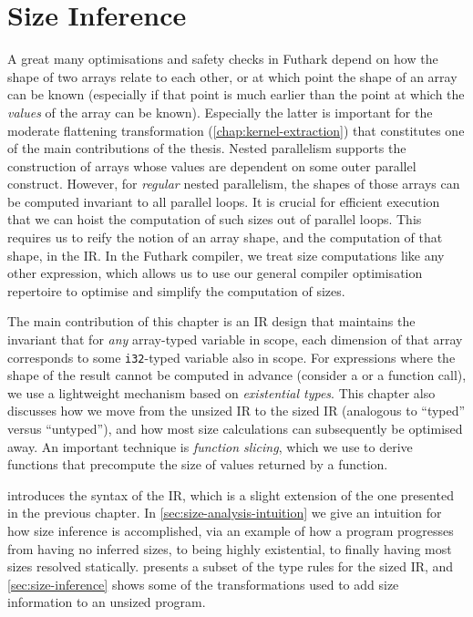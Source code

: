 \newcommand{\subtype}{<:}

\chapter{Size Inference}
\label{chap:size-analysis}

A great many optimisations and safety checks in Futhark depend on how
the shape of two arrays relate to each other, or at which point the
shape of an array can be known (especially if that point is much
earlier than the point at which the \textit{values} of the array can
be known).  Especially the latter is important for the moderate
flattening transformation (\cref{chap:kernel-extraction}) that
constitutes one of the main contributions of the thesis.  Nested
parallelism supports the construction of arrays whose values are
dependent on some outer parallel construct.  However, for
\textit{regular} nested parallelism, the shapes of those arrays can be
computed invariant to all parallel loops.  It is crucial for efficient
execution that we can hoist the computation of such sizes out of
parallel loops.  This requires us to reify the notion of an array
shape, and the computation of that shape, in the IR.  In the Futhark
compiler, we treat size computations like any other expression, which
allows us to use our general compiler optimisation repertoire to
optimise and simplify the computation of sizes.

The main contribution of this chapter is an IR design that maintains
the invariant that for \textit{any} array-typed variable in scope,
each dimension of that array corresponds to some \lstinline{i32}-typed
variable also in scope.  For expressions where the shape of the result
cannot be computed in advance (consider a  or a function
call), we use a lightweight mechanism based on \textit{existential
  types}.  This chapter also discusses how we move from the unsized IR
to the sized IR (analogous to ``typed'' versus ``untyped''), and how
most size calculations can subsequently be optimised away.  An
important technique is \textit{function slicing}, which we use to
derive functions that precompute the size of values returned by a
function.

 introduces the syntax of the IR, which is a slight
extension of the one presented in the previous chapter.  In
\cref{sec:size-analysis-intuition} we give an intuition for how size
inference is accomplished, via an example of how a program progresses
from having no inferred sizes, to being highly existential, to finally
having most sizes resolved statically.  
presents a subset of the type rules for the sized IR, and
\cref{sec:size-inference} shows some of the transformations used to
add size information to an unsized program.

